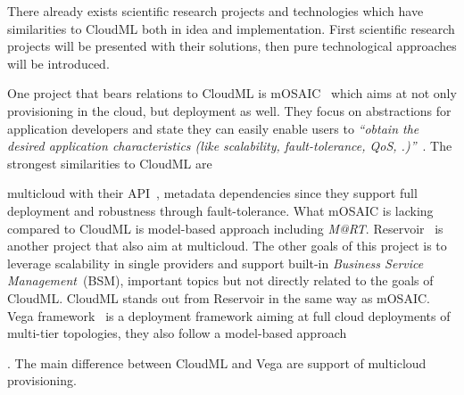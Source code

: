 


There already exists scientific research projects and technologies
which have similarities to CloudML both in idea and implementation. 
First scientific research projects will be presented with their solutions, 
then pure technological approaches will be introduced.

One project that bears relations to CloudML is mOSAIC~\cite{portable:petcu12} which
aims at not only provisioning in the cloud, but deployment as well.
They focus on abstractions for application developers and state they can easily enable users to
\emph{``obtain the desired application characteristics (like
scalability, fault-tolerance, QoS, \etc.)''}~\cite{architecturing:petcu11}.
The strongest similarities to CloudML are 
\begin{ii}\iitem multicloud with their API~\cite{architecturing:petcu11},
\iitem metadata dependencies since they support full deployment and
\iitem robustness through fault-tolerance.
What mOSAIC is lacking compared to CloudML is model-based approach including \emph{M@RT}.
Reservoir~\cite{reservoir:rochweger09} is another project that also aim at
\iitem multicloud. The other goals of this project is to leverage 
scalability in single providers and support built-in \emph{Business Service Management}~(BSM),
important topics but not directly related to the goals of CloudML.
CloudML stands out from Reservoir in the same way as mOSAIC.
Vega framework~\cite{simplifying:chieu10} is a deployment framework aiming 
at full cloud deployments of multi-tier topologies, they also follow a \iitem model-based 
approach\end{ii}. The main difference between CloudML and Vega are support of multicloud provisioning.

